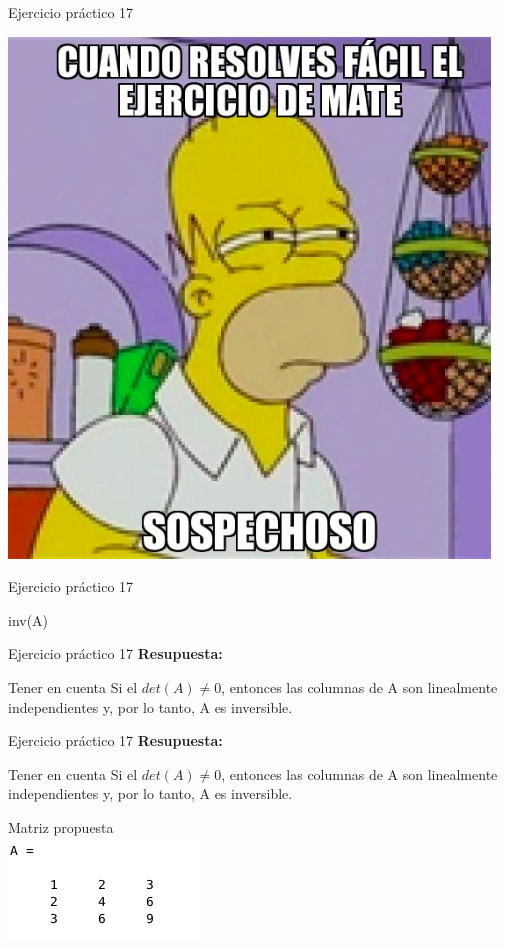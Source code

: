\documentclass{bredelebeamer}
\begin{document}
\begin{frame}{Ejercicio práctico 17}
\begin{center}
\includegraphics[scale=0.35]{images/img43.png}
\end{center}
\end{frame}

\begin{frame}{Ejercicio práctico 17}
\begin{center}
\LARGE inv(A)
\end{center}
\end{frame}

\begin{frame}{Ejercicio práctico 17}
\textbf{Resupuesta:}
\begin{block}{Tener en cuenta}
Si el $det(A)\neq 0$, entonces las columnas de A son linealmente independientes y, por lo tanto, A es inversible.
\end{block}
\end{frame}

\begin{frame}{Ejercicio práctico 17}
\textbf{Resupuesta:}
\begin{block}{Tener en cuenta}
Si el $det(A)\neq 0$, entonces las columnas de A son linealmente independientes y, por lo tanto, A es inversible.
\end{block}
\begin{center}
Matriz propuesta\\
\includegraphics[scale=0.5]{images/img44.png}
\end{center}
\end{frame}
\end{document}

